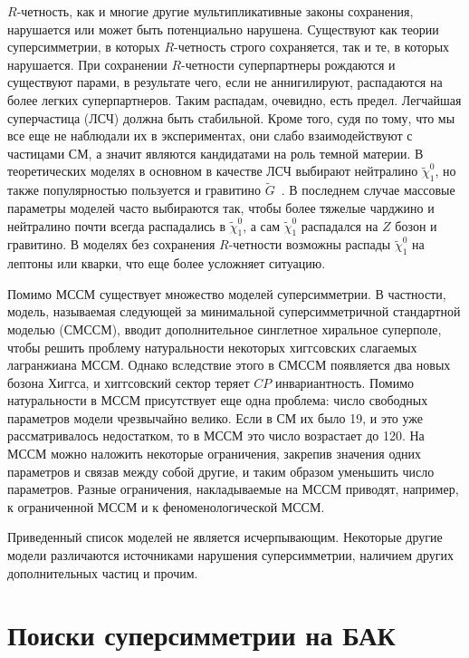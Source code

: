 \documentclass[a4paper, 10pt, twocolumn]{article}
\begin{document}
$R$-четность, как и многие другие мультипликативные законы сохранения, 
нарушается или может быть потенциально нарушена. Существуют как теории 
суперсимметрии, в которых $R$-четность строго сохраняется, так и те, 
в которых нарушается. При сохранении $R$-четности суперпартнеры 
рождаются и существуют парами, в результате чего, если не аннигилируют, 
распадаются на более легких суперпартнеров. Таким распадам, очевидно, 
есть предел. Легчайшая суперчастица (ЛСЧ) должна быть стабильной. Кроме 
того, судя по тому, что мы все еще не наблюдали их в экспериментах, они 
слабо взаимодействуют с частицами СМ, а значит являются кандидатами на 
роль темной материи. В теоретических моделях в основном в качестве ЛСЧ 
выбирают нейтралино $\tilde{\chi}^0_1$, но также популярностью 
пользуется и гравитино $\tilde{G}$~\cite{models}. В последнем случае 
массовые параметры моделей часто выбираются так, чтобы более тяжелые 
чарджино и нейтралино почти всегда распадались в $\tilde{\chi}^0_1$, 
а сам $\tilde{\chi}^0_1$ распадался на $Z$ бозон и гравитино. В моделях 
без сохранения $R$-четности возможны распады $\tilde{\chi}^0_1$ на 
лептоны или кварки, что еще более усложняет ситуацию.

Помимо МССМ существует множество моделей суперсимметрии. В частности, 
модель, называемая следующей за минимальной суперсимметричной 
стандартной моделью (СМССМ), вводит дополнительное синглетное хиральное 
суперполе, чтобы решить проблему натуральности некоторых хиггсовских 
слагаемых лагранжиана МССМ. Однако вследствие этого в СМССМ появляется 
два новых бозона Хиггса, и хиггсовский сектор теряет $CP$ 
инвариантность. Помимо натуральности в МССМ присутствует еще одна 
проблема: число свободных параметров модели чрезвычайно велико. Если 
в СМ их было 19, и это уже рассматривалось недостатком, то в МССМ это 
число возрастает до 120. На МССМ можно наложить некоторые ограничения, 
закрепив значения одних параметров и связав между собой другие, и таким 
образом уменьшить число параметров. Разные ограничения, накладываемые 
на МССМ приводят, например, к ограниченной \mbox{МССМ} 
и к феноменологической МССМ.

Приведенный список моделей не является исчерпывающим. Некоторые другие 
модели различаются источниками нарушения суперсимметрии, наличием 
других дополнительных частиц и прочим.


\section{Поиски суперсимметрии на БАК}
\end{document}
